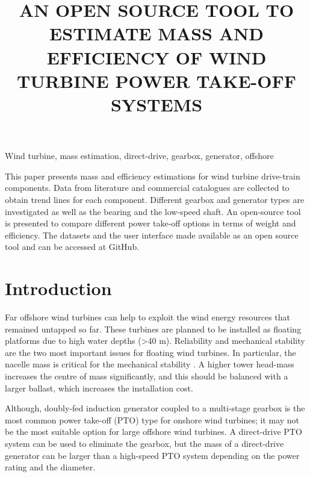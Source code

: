 \documentclass{article}\usepackage{graphicx, color}
\begin{document}
\title{AN OPEN SOURCE TOOL TO ESTIMATE MASS AND EFFICIENCY OF WIND TURBINE POWER TAKE-OFF SYSTEMS}


\maketitle

\keywords
Wind turbine, mass estimation, direct-drive, gearbox, generator, offshore

\abstract

This paper presents mass and efficiency estimations for wind turbine drive-train components. Data from literature and commercial catalogues are collected to obtain trend lines for each component. Different gearbox and generator types are investigated as well as the bearing and the low-speed shaft. An open-source tool is presented to compare different power take-off options in terms of weight and efficiency. The datasets and the user interface made available as an open source tool and can be accessed at GitHub.

\section{Introduction}

Far offshore wind turbines can help to exploit the wind energy resources that remained untapped so far. These turbines are planned to be installed as floating platforms due to  high water depths (\textgreater 40 m). Reliability and mechanical stability are the two most important issues for floating wind turbines. In particular, the nacelle mass is critical for the mechanical stability \cite{Christiansen2011, Sethuraman2013}. A higher tower head-mass increases the centre of mass significantly, and this should be balanced with a larger ballast, which increases the installation cost.

\vspace{6pt}

Although, doubly-fed induction generator coupled to a multi-stage gearbox is the most common power take-off (PTO) type for onshore wind turbines; it may not be the most suitable option for large offshore wind turbines. A direct-drive PTO system can be used to eliminate the gearbox, but the mass of a direct-drive generator can be larger than a high-speed PTO system depending on the power rating and the diameter.
\end{document}
